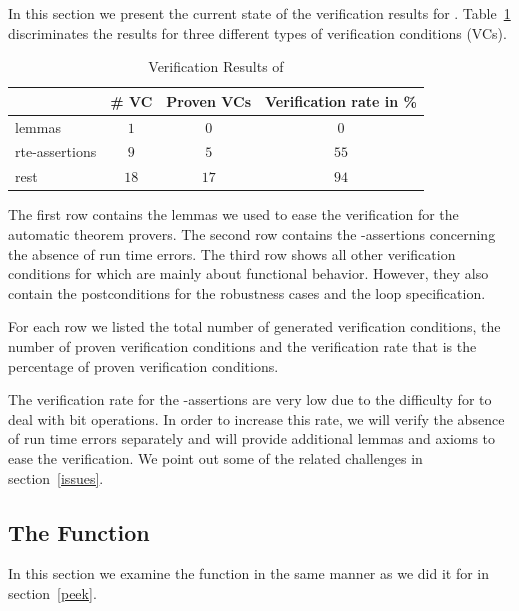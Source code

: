 In this section we present the current state of the verification results 
for \peek.
Table~\ref{tab:results-peek} discriminates the results for
three different types of verification conditions (VCs).

\begin{table}[hbt]
  \centering
  \begin{tabular}[htb]{lccc}
    \toprule
     & \# VC & Proven VCs & Verification rate in \%\\
    \midrule
    lemmas & $1$ &$0$ & $0$ \\
    rte-assertions&$9$&$5$&$55$\\
    rest &$18$ &$17$&$94$\\
    \bottomrule
  \end{tabular}
  \caption{Verification Results of \peek}
  \label{tab:results-peek}
\end{table}


The first row contains the lemmas we used to ease the verification for the automatic theorem provers.
The second row contains the -assertions 
concerning the absence of run time errors.
The third row shows all other verification conditions for \peek
which are mainly about functional behavior.
However, they also contain the postconditions for the robustness cases
and the loop specification.

For each row we listed the total number of generated verification conditions,
the number of proven verification conditions and the verification rate
that is the percentage of proven verification conditions. 

The verification rate for the -assertions are very low 
due to the difficulty for \framac to deal with bit operations.
In order to increase this rate, we will verify the absence
of run time errors separately and will provide additional lemmas and axioms
to ease the verification.
We point out some of the related challenges in section~\ref{issues}.



\clearpage

\subsection{The Function \poke}
\label{poke}


In this section we examine the function \poke
in the same manner as we did it for \peek in section~\ref{peek}.

